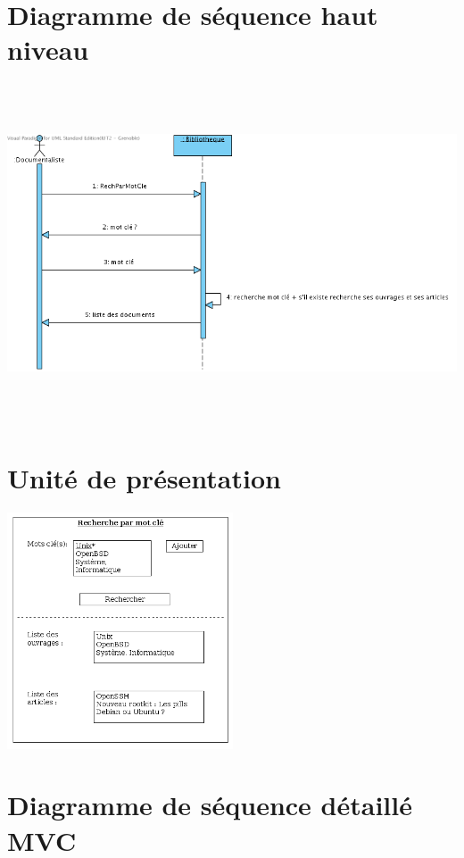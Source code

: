 \documentclass[a4paper,10pt]{report}
\begin{document}
\section*{Diagramme de séquence haut niveau}
\bigskip
\bigskip
\bigskip
\includegraphics[height=100mm]{RechParMotCleHautNiveau.png}

\newpage

\section*{Unité de présentation}
\includegraphics[height=70mm]{UpRechParMotCle.png}

\section*{Diagramme de séquence détaillé MVC}
\end{document}
